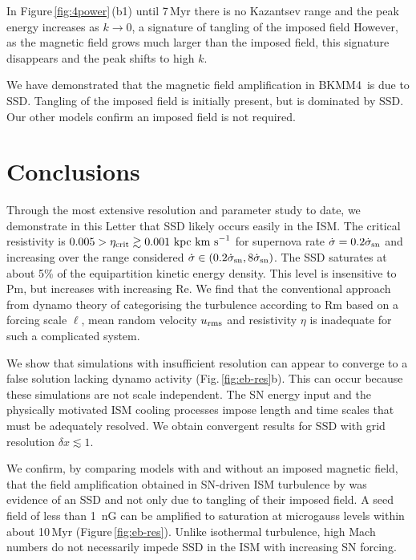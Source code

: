 \documentclass[preprint2]{aastex63}
\newcommand\SNr{\dot\sigma_{\rm sn}}
\newcommand\kpc{~ {\rm kpc}}
\newcommand\dx{ {\delta x}}
\newcommand\kms{~ {\rm km~ s}^{-1}}
\newcommand\BKM{{\sf BKMM4}}
\begin{document}
 In Figure\,\ref{fig:4power}\,(b1) {until 7\,Myr there is no Kazantsev range
 and the peak energy increases as $k\rightarrow0$, a signature of tangling of
 the imposed field
 However, as the magnetic field grows much larger than the imposed field,
 this signature disappears and the peak shifts to high $k$.}
 
 {We have demonstrated that the magnetic field amplification in \BKM\ is
 due to SSD. 
 Tangling of the imposed field is {initially} present, but is
 dominated by SSD. {O}ur other models 
 confirm an imposed field is not required.
 }

\section{Conclusions}\label{sec:conc}

 {Through the most extensive resolution and parameter study to date, we
   demonstrate in this Letter that SSD
{likely occurs easily}
 in the ISM.
 The critical resistivity is $0.005>\eta_{\rm crit}\gtrsim0.001\kpc\kms$ for 
 supernova rate $\dot \sigma=0.2\SNr$ and increasing over the 
 range considered $\dot \sigma\in(0.2\SNr,8\SNr)$.
 The SSD
 saturates at about 5\% of the equipartition kinetic energy
 density.
 This level is insensitive to Pm, but increases with increasing Re.}
 We find that the conventional approach from dynamo theory of categorising the 
 turbulence according to Rm based on a forcing scale $\ell$, mean random
 velocity $u_{\rm rms}$ and resistivity $\eta$ is inadequate for such a
 complicated system.

 We show that simulations with insufficient resolution can appear to
 converge to a false solution lacking dynamo activity
 (Fig.\,\ref{fig:eb-res}b). This can occur because these simulations are not
 scale independent. 
 The SN energy input and the physically motivated ISM cooling processes impose
 length and time scales that must be adequately resolved.
 {We obtain convergent results for SSD with grid resolution
 $\dx\lesssim1$.}

{We confirm,
  by comparing models with and without an imposed magnetic field,
 that the field amplification obtained in SN-driven ISM turbulence by
 \citet{BKMM04}
 was evidence of an SSD and not only due to tangling of their imposed field.}
 A seed field of less than 1~nG can be amplified to saturation at microgauss
 levels within about 10\,Myr (Figure\,\ref{fig:eb-res}). 
 Unlike isothermal turbulence, high Mach numbers do not necessarily impede SSD
 in the ISM with increasing SN forcing.
\end{document}
